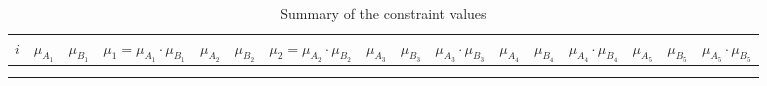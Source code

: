 \documentclass[a4paper,openany]{book}
\begin{document}
				\begin{center}
					\normalsize
					\begin{landscape}
						\begin{longtable}[c]{|l|c|c|c|c|c|c|c|c|c|c|c|c|c|c|c|}
							\hline
							\textbf{$i$} & \textbf{$\mu_{A_1}$} & \textbf{$\mu_{B_1}$} & \textbf{$\mu_1 = \mu_{A_1}\cdot\mu_{B_1}$} & \textbf{$\mu_{A_2}$} & \textbf{$\mu_{B_2}$} & \textbf{$\mu_2 = \mu_{A_2}\cdot\mu_{B_2}$}& \textbf{$\mu_{A_3}$} & \textbf{$\mu_{B_3}$} & \textbf{$\mu_{A_3}\cdot\mu_{B_3}$}  & \textbf{$\mu_{A_4}$} & \textbf{$\mu_{B_4}$} & \textbf{$\mu_{A_4}\cdot\mu_{B_4}$} & \textbf{$\mu_{A_5}$} & \textbf{$\mu_{B_5}$} & \textbf{$\mu_{A_5}\cdot\mu_{B_5}$}\\
							\hline
							\endfirsthead
							
							
							\caption{Summary of the constraint values }\label{table:tb1}\\
							\endfoot
							


\end{longtable}
\end{landscape}
\end{center}
\end{document}
